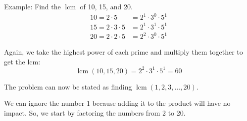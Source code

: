\documentclass{article}
\DeclareMathOperator{\lcm}{lcm}
\begin{document}
Example: Find the \(\lcm\) of 10, 15, and 20.
\[\begin{aligned}
    10 = 2 \cdot 5 &= 2^1 \cdot 3^0 \cdot 5^1 \\
    15 = 2 \cdot 3 \cdot 5 &= 2^1 \cdot 3^1 \cdot 5^1 \\
    20 = 2 \cdot 2 \cdot 5 &= 2^2 \cdot 3^0 \cdot 5^1
\end{aligned}\]

Again, we take the highest power of each prime and multiply them together to get the lcm:
\[\lcm(10, 15, 20) = 2^2 \cdot 3^1 \cdot 5^1 = 60\]

The problem can now be stated as finding \(\lcm(1, 2, 3, \dots, 20)\).

We can ignore the number 1 because adding it to the product will have no impact. So, we start by factoring the numbers from 2 to 20.
\end{document}
